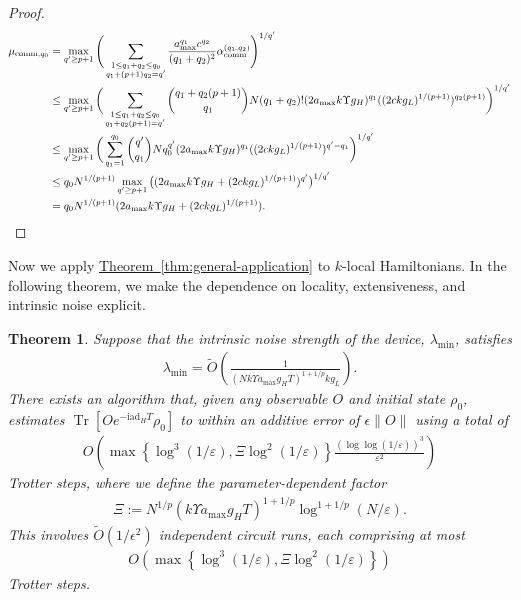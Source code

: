 \documentclass[aps,pra,reprint,groupedaddress,floatfix]{revtex4-2}
\newtheorem{theorem}{Theorem}
\newcommand{\thm}[1]{\hyperref[thm:#1]{Theorem~\ref*{thm:#1}}}
\renewcommand{\i}{\mathrm{i}}
\newcommand{\ad}{\mathrm{ad}}
\newcommand{\eps}{\varepsilon}
\begin{document}
\begin{proof}
\begin{align*}
        \mu_{\mathrm{comm},q_0} &= \max_{q' \ge p+1} \Bigg(\sum_{\substack{1\le q_1+q_2\le q_0 \\
        q_1+(p+1)q_2 = q'}}\frac{a_{\max}^{q_1}c^{q_2}}{(q_1+q_2)^2} \alpha_{\rm comm}^{(q_1, q_2)}\Bigg)^{1/q'} \\
        &\le \max_{q' \ge p+1} \bigg(\sum_{\substack{1\le q_1+q_2\le q_0 \\
        q_1+q_2(p+1) = q'}}\binom{q_1+q_2(p+1)}{q_1}N(q_1+q_2)!(2a_{\max}k\Upsilon g_H)^{q_1}((2ckg_L)^{1/(p+1)})^{q_2(p+1)}\bigg)^{1/q'}\\
        &\le \max_{q' \ge p+1} \bigg(\sum_{q_1=1}^{q_0}\binom{q'}{q_1}Nq_0^{q'}(2a_{\max}k\Upsilon g_H)^{q_1}((2ckg_L)^{1/(p+1)})^{q'-q_1}\bigg)^{1/q'}\\
        &\le q_0N^{1/(p+1)}\max_{q'\ge p+1} \big((2a_{\max}k\Upsilon g_H+(2ckg_L)^{1/(p+1)})^{q'}\big)^{1/q'}\\
        &=q_0N^{1/(p+1)}(2a_{\max}k\Upsilon g_H+(2ckg_L)^{1/(p+1)}).
    \end{align*}
\end{proof}

Now we apply \thm{general-application} to $k$-local Hamiltonians. In the following theorem, we make the dependence on locality, extensiveness, and intrinsic noise explicit.  
\begin{theorem}
\label{thm:extrapolation-k-local}
    Suppose that the intrinsic noise strength of the device, $\lambda_{\min}$, satisfies
    \begin{align}
    \label{eq:cond-lambda}
        \lambda_{\min} = \widetilde{O}\left(\frac{1}{(Nk\Upsilon a_{\max}g_HT)^{1+1/p} kg_L}\right).
    \end{align} 
    There exists an algorithm that, given any observable $O$ and initial state $\rho_0$, estimates $\operatorname{Tr}[O e^{-\i \ad_H T}\rho_0]$ to within an additive error of $\epsilon\|O\|$ using a total of 
    \begin{align*}
        O\left( \max\left\{\log^3(1/\eps), \Xi \log^2(1/\eps)\right\} \frac{(\log\log (1/\eps))^3}{\eps^2} \right)
    \end{align*}
    Trotter steps, where we define the parameter-dependent factor
    \begin{align*}
        \Xi := N^{1/p}(k\Upsilon a_{\max} g_H T)^{1+1/p} \log^{1+1/p}(N/\eps).
    \end{align*}
    This involves $\widetilde{O}(1/\epsilon^2)$ independent circuit runs, each comprising at most
    \begin{align*}
        O\left( \max\left\{\log^3(1/\eps), \Xi \log^2(1/\eps)\right\} \right)
    \end{align*}
    Trotter steps.
\end{theorem}
\end{document}
